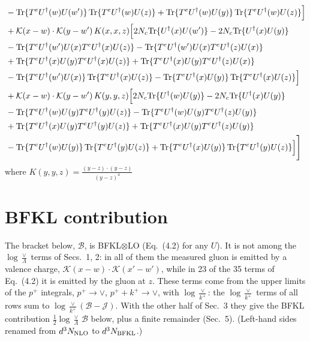 \documentclass[9pt]{article}
\numberwithin{equation}{section}
\newcommand{\new}[1]{{\color{blue}#1}}
\newcommand{\old}[1]{{\color{red}#1}}
\begin{document}
\begin{align}
&-{\rm Tr}\{T^eU^\dagger(w)U(w')\}\,{\rm Tr}\{T^eU^\dagger(w)U(z)\}+{\rm Tr}\{T^eU^\dagger(w)U(y)\}\,{\rm Tr}\{T^eU^\dagger(w)U(z)\}\Big]\notag\\
&+\mathcal K(x-w)\cdot\mathcal K(y-w')\,K(x,x,z)\Big[2 N_c{\rm Tr}\{U^\dagger(x)U(w')\}-2 N_c{\rm Tr}\{U^\dagger(x)U(y)\}\notag\\
&-{\rm Tr}\{T^eU^\dagger(w')U(x)T^eU^\dagger(x)U(z)\}-{\rm Tr}\{T^eU^\dagger(w')U(x)T^eU^\dagger(z)U(x)\}\notag\\
&+{\rm Tr}\{T^eU^\dagger(x)U(y)T^eU^\dagger(x)U(z)\}+{\rm Tr}\{T^eU^\dagger(x)U(y)T^eU^\dagger(z)U(x)\}\notag\\
&-{\rm Tr}\{T^eU^\dagger(w')U(x)\}\,{\rm Tr}\{T^eU^\dagger(x)U(z)\}-{\rm Tr}\{T^eU^\dagger(x)U(y)\}\,{\rm Tr}\{T^eU^\dagger(x)U(z)\}\Big]\notag\\
&+\mathcal K(x-w)\cdot\mathcal K(y-w')\,K(y,y,z)\Big[2 N_c{\rm Tr}\{U^\dagger(w)U(y)\}-2 N_c{\rm Tr}\{U^\dagger(x)U(y)\}\notag\\
&-{\rm Tr}\{T^eU^\dagger(w)U(y)T^eU^\dagger(y)U(z)\}-{\rm Tr}\{T^eU^\dagger(w)U(y)T^eU^\dagger(z)U(y)\}\notag\\
&+{\rm Tr}\{T^eU^\dagger(x)U(y)T^eU^\dagger(y)U(z)\}+{\rm Tr}\{T^eU^\dagger(x)U(y)T^eU^\dagger(z)U(y)\}\notag\\
&-{\rm Tr}\{T^eU^\dagger(w)U(y)\}\,{\rm Tr}\{T^eU^\dagger(y)U(z)\}+{\rm Tr}\{T^eU^\dagger(x)U(y)\}\,{\rm Tr}\{T^eU^\dagger(y)U(z)\}\Big]\Bigg]
\end{align}
where $K(y,y,z) = \frac{(y-z)\cdot (y-z)}{(y-z)^{4}}$
\section{BFKL contribution}
\new{The bracket below, $\mathcal B$, is BFKL$\otimes$LO (Eq.~(4.2) for any $U$). It is not among the $\log\frac{\vee}{\Lambda}$ terms of Secs.~1, 2: in all of them the measured gluon is emitted by a valence charge, $\mathcal K(x-w)\cdot\mathcal K(x'-w')$, while in 23 of the 35 terms of Eq.~(4.2) it is emitted by the gluon at $z$. These terms come from the upper limits of the $p^+$ integrals, $p^+\to\vee$, $p^++k^+\to\vee$, with $\log\frac{\vee}{k^+}$: the $\log\frac{\vee}{k^+}$ terms of all rows sum to $\log\frac{\vee}{k^+}(\mathcal B-\mathcal J)$. With the other half of Sec.~3 they give the BFKL contribution $\frac12\log\frac{\vee}{\Lambda}\,\mathcal B$ below, plus a finite remainder (Sec.~5). (Left-hand sides renamed from \old{$d^3N_{\rm NLO}$} to \new{$d^3N_{\rm BFKL}$}.)}
\end{document}

